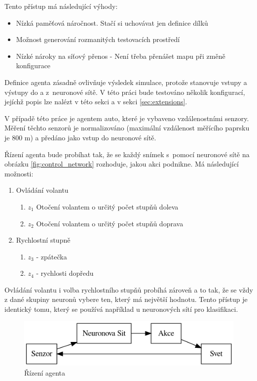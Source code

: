 Tento přístup má následující výhody:
\begin{itemize}
	\item Nízká paměťová náročnost. Stačí si uchovávat jen definice dílků
	\item Možnost generování rozmanitých testovacích prostředí
	\item Nízké nároky na síťový přenos - Není třeba přenášet mapu při změně konfigurace
\end{itemize}

\label{sec:agent}
Definice agenta zásadně ovlivňuje výsledek simulace, protože stanovuje vstupy a výstupy do a z~neuronové sítě. V této práci bude testováno několik konfigurací, jejíchž popis lze nalézt v této sekci a v sekci \ref{sec:extensions}.

V případě této práce je agentem auto, které je vybaveno vzdálenostními senzory. Měření těchto senzorů je normalizováno (maximální vzdálenost měřícího paprsku je 800 m) a předáno jako vstup do neuronové sítě.

Řízení agenta bude probíhat tak, že se každý snímek s~pomocí neuronové sítě na obrázku \ref{fig:control_network} rozhoduje, jakou akci podnikne. Má následující možnosti:

\begin{enumerate}
	\item Ovládání volantu 
	\begin{enumerate}
		\item $z_1$ Otočení volantem o určitý počet stupňů doleva
		\item $z_2$ Otočení volantem o určitý počet stupňů doprava
	\end{enumerate} 
	\item Rychlostní stupně
	\begin{enumerate}
		\item $z_3$ - zpátečka
		\item $z_4$ - rychlosti dopředu
	\end{enumerate}
\end{enumerate}

Ovládání volantu i volba rychlostního stupňů probíhá zároveň a to tak, že se vždy z dané skupiny neuronů vybere ten, který má největší hodnotu. Tento přístup je identický tomu, který se používá například u neuronových sítí pro klasifikaci.

\begin{figure}[H]
	\centering
	\includegraphics[width=0.7\linewidth]{AgentSchema}
	\caption{Řízení agenta}
	\label{fig:agentschema}
\end{figure}

